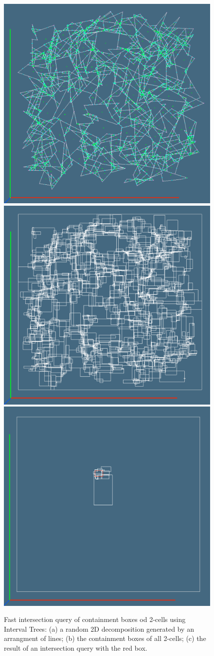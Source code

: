 \documentclass[11pt, oneside]{article}   	%
\begin{document}
\begin{figure}[htbp] %
   \centering
   \includegraphics[width=0.328\textheight,width=0.328\textwidth]{2dcells0} 
   \includegraphics[width=0.328\textheight,width=0.328\textwidth]{2dcells1} 
   \includegraphics[width=0.328\textheight,width=0.328\textwidth]{2dcells2} 
   \caption{Fast intersection query of containment boxes od 2-cells using Interval Trees: (a) a random 2D decomposition generated by an arrangment of lines; (b) the containment boxes of all 2-cells; (c)  the result of an intersection query with the red box.}
   \label{fig:testWall}
\end{figure}
\end{document}
